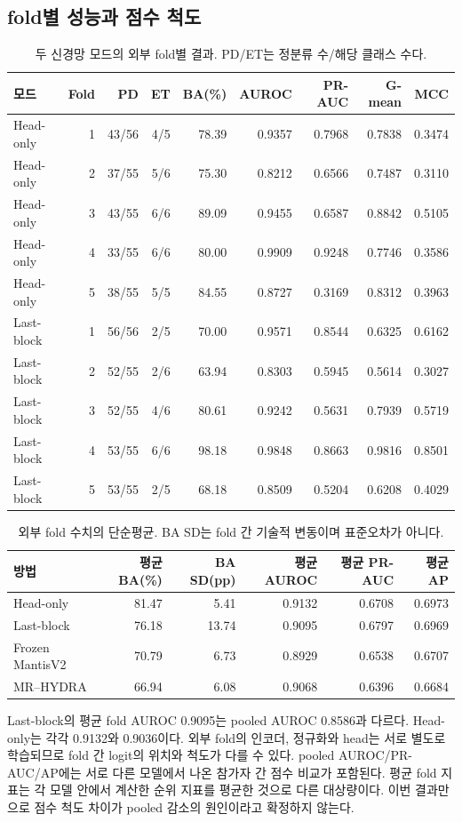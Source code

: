 \documentclass[11pt,a4paper]{article}
\begin{document}
\subsection{fold별 성능과 점수 척도}
\begin{table}[H]\centering\small\setlength{\tabcolsep}{4pt}
\caption{두 신경망 모드의 외부 fold별 결과. PD/ET는 정분류 수/해당 클래스 수다.}
\begin{tabular}{@{}lrrrrrrrr@{}}\toprule
모드 & Fold & PD & ET & BA(\%) & AUROC & PR-AUC & G-mean & MCC\\\midrule
Head-only & 1 & 43/56 & 4/5 & 78.39 & 0.9357 & 0.7968 & 0.7838 & 0.3474 \\
Head-only & 2 & 37/55 & 5/6 & 75.30 & 0.8212 & 0.6566 & 0.7487 & 0.3110 \\
Head-only & 3 & 43/55 & 6/6 & 89.09 & 0.9455 & 0.6587 & 0.8842 & 0.5105 \\
Head-only & 4 & 33/55 & 6/6 & 80.00 & 0.9909 & 0.9248 & 0.7746 & 0.3586 \\
Head-only & 5 & 38/55 & 5/5 & 84.55 & 0.8727 & 0.3169 & 0.8312 & 0.3963 \\
Last-block & 1 & 56/56 & 2/5 & 70.00 & 0.9571 & 0.8544 & 0.6325 & 0.6162 \\
Last-block & 2 & 52/55 & 2/6 & 63.94 & 0.8303 & 0.5945 & 0.5614 & 0.3027 \\
Last-block & 3 & 52/55 & 4/6 & 80.61 & 0.9242 & 0.5631 & 0.7939 & 0.5719 \\
Last-block & 4 & 53/55 & 6/6 & 98.18 & 0.9848 & 0.8663 & 0.9816 & 0.8501 \\
Last-block & 5 & 53/55 & 2/5 & 68.18 & 0.8509 & 0.5204 & 0.6208 & 0.4029 \\
\bottomrule\end{tabular}
\end{table}
\begin{table}[H]\centering\small\setlength{\tabcolsep}{4pt}
\caption{외부 fold 수치의 단순평균. BA SD는 fold 간 기술적 변동이며 표준오차가 아니다.}
\begin{tabular}{@{}lrrrrr@{}}\toprule
방법 & 평균 BA(\%) & BA SD(pp) & 평균 AUROC & 평균 PR-AUC & 평균 AP\\\midrule
Head-only & 81.47 & 5.41 & 0.9132 & 0.6708 & 0.6973 \\
Last-block & 76.18 & 13.74 & 0.9095 & 0.6797 & 0.6969 \\
Frozen MantisV2 & 70.79 & 6.73 & 0.8929 & 0.6538 & 0.6707 \\
MR--HYDRA & 66.94 & 6.08 & 0.9068 & 0.6396 & 0.6684 \\
\bottomrule\end{tabular}
\end{table}
Last-block의 평균 fold AUROC 0.9095는 pooled AUROC 0.8586과 다르다.
Head-only는 각각 0.9132와 0.9036이다.
외부 fold의 인코더, 정규화와 head는 서로 별도로 학습되므로
fold 간 logit의 위치와 척도가 다를 수 있다.
pooled AUROC/PR-AUC/AP에는 서로 다른 모델에서 나온 참가자 간 점수 비교가 포함된다.
평균 fold 지표는 각 모델 안에서 계산한 순위 지표를 평균한 것으로 다른 대상량이다.
이번 결과만으로 점수 척도 차이가 pooled 감소의 원인이라고 확정하지 않는다.
\end{document}
